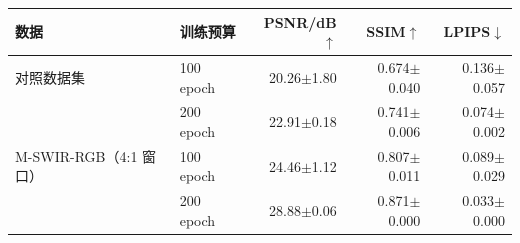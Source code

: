 \begin{tabular}{@{}llrrr@{}}
\toprule
数据 & 训练预算 & PSNR/dB$\uparrow$ & SSIM$\uparrow$ & LPIPS$\downarrow$\\
\midrule
对照数据集\cite{chen2026thesis} & 100 epoch & 20.26$\pm$1.80 & 0.674$\pm$0.040 & 0.136$\pm$0.057 \\
 & 200 epoch & 22.91$\pm$0.18 & 0.741$\pm$0.006 & 0.074$\pm$0.002 \\
\midrule
M-SWIR-RGB（4:1 窗口） & 100 epoch & 24.46$\pm$1.12 & 0.807$\pm$0.011 & 0.089$\pm$0.029 \\
 & 200 epoch & 28.88$\pm$0.06 & 0.871$\pm$0.000 & 0.033$\pm$0.000 \\
\bottomrule
\end{tabular}
